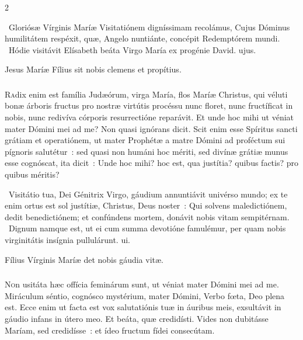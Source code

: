 \documentclass[9pt,twoside]{extarticle}
\begin{document}
\begin{multicols}{2}
\begin{tightlist}{}
\item {}~Gloriósæ Vírginis Maríæ Visitatiónem digníssimam recolámus, \textred{*} Cujus Dóminus humilitátem respéxit, quæ, Angelo nuntiánte, concépit Redemptórem mundi. ~Hódie visitávit Elísabeth beáta Virgo María ex progénie David. ujus.
\item {} Jesus Maríæ Fílius sit nobis clemens et propítius.
\end{tightlist}

\subsubsection*{\center {}}
\lettrine{R}adix enim est família Judæórum, virga María, flos Maríæ Christus, qui véluti bonæ árboris fructus pro nostræ virtútis procéssu nunc floret, nunc fructíficat in nobis, nunc redivíva córporis resurrectióne reparávit. Et unde hoc mihi ut véniat mater Dómini mei ad me? Non quasi ignórans dicit. Scit enim esse Spíritus sancti grátiam et operatiónem, ut mater Prophétæ a matre Dómini ad proféctum sui pígnoris salutétur~: sed quasi non humáni hoc mériti, sed divínæ grátiæ munus esse cognóscat, ita dicit~: Unde hoc mihi? hoc est, qua justítia? quibus factis? pro quibus méritis?

\begin{tightlist}{}
\item {}~Visitátio tua, Dei Génitrix Virgo, gáudium annuntiávit univérso mundo; ex te enim ortus est sol justítiæ, Christus, Deus noster~: \textred{*} Qui solvens maledictiónem, dedit benedictiónem; et confúndens mortem, donávit nobis vitam sempitérnam. ~Dignum namque est, ut ei cum summa devotióne famulémur, per quam nobis virginitátis insígnia pullulárunt. ui.
\item {} Fílius Vírginis Maríæ det nobis gáudia vitæ.
\end{tightlist}

\subsubsection*{\center {}}
\lettrine{N}on usitáta hæc offícia feminárum sunt, ut véniat mater Dómini mei ad me. Miráculum séntio, cognósco mystérium, mater Dómini, Verbo fœta, Deo plena est. Ecce enim ut facta est vox salutatiónis tuæ in áuribus meis, exsultávit in gáudio infans in útero meo. Et beáta, quæ credidísti. Vides non dubitásse Maríam, sed credidísse~: et ídeo fructum fídei consecútam.


\end{multicols}
\end{document}
